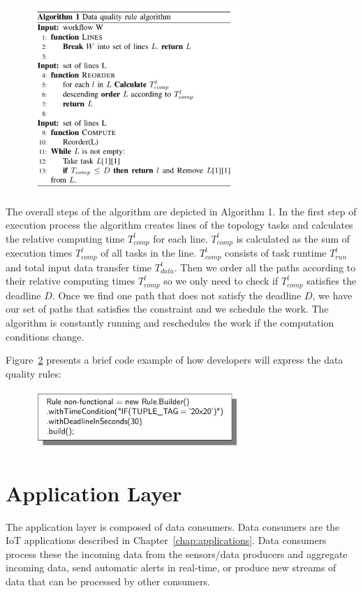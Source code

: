 \begin{figure}[h!]
  \centering
  \includegraphics[width=0.7\textwidth]{Figures/Algorithm.pdf}
  \label{fig:Algorithm}
\end{figure}

The overall steps of the algorithm are depicted in Algorithm 1. In the first step of execution process the algorithm creates lines of the topology tasks and calculates the relative computing time $T_{comp}^l$ for each line. $T_{comp}^l$ is calculated as the sum of execution times $T_{comp}^l$ of all tasks in the line. $T_{comp}^l$ consists of task runtime $T_{run}^t$ and total input data transfer time $T_{data}^t$. Then we order all the paths according to their relative computing times $T_{comp}^l$ so we only need to check if $T_{comp}^l$ satisfies the deadline $D$. Once we find one path that does not satisfy the deadline $D$, we have our set of paths that satisfies the constraint and we schedule the work. The algorithm is constantly running and reschedules the work if the computation conditions change.

Figure~\ref{fig:qosRule} presents a brief code example of how developers will express the data quality rules:

\begin{figure}[h!]
  \centering
  \includegraphics[width=0.7\textwidth]{Figures/qosRule.pdf}
  \caption{}\label{fig:qosRule}
\end{figure}

\section{Application Layer}

The application layer is composed of data consumers. Data consumers are the IoT applications described in Chapter~\ref{chap:applications}. Data consumers process these the incoming data from the sensors/data producers and aggregate incoming data, send automatic alerts in real-time, or produce new streams of data that can be processed by other consumers.
